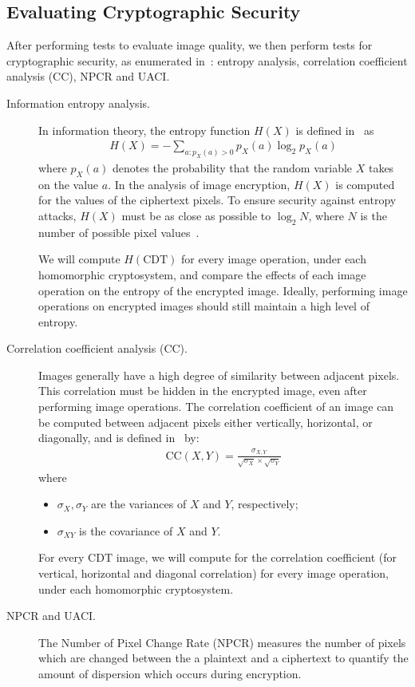 \subsection{Evaluating Cryptographic Security}
After performing tests to evaluate image quality, we then perform tests for cryptographic security, as enumerated in~\cite{ahmed_benchmark_2016}: entropy analysis, correlation coefficient analysis (CC), NPCR and UACI.
\begin{description}
	\item [Information entropy analysis.] In information theory, the entropy function $H(X)$ is defined in~\cite{bauer_information_2005} as
	\begin{align}
		H(X) = - \sum_{a:p_X(a)>0}{p_X(a)\log_2{p_X(a)}}
	\end{align}
	where $p_X(a)$ denotes the probability that the random variable $X$ takes on the value $a$.
	In the analysis of image encryption, $H(X)$ is computed for the values of the ciphertext pixels. To ensure security against entropy attacks, $H(X)$ must be as close as possible to $\log_2{N}$, where $N$ is the number of possible pixel values~\cite{ahmed_benchmark_2016}.

    We will compute $H(\mathrm{CDT})$ for every image operation, under each homomorphic cryptosystem, and compare the effects of each image operation on the entropy of the encrypted image. Ideally, performing image operations on encrypted images should still maintain a high level of entropy.
	\item [Correlation coefficient analysis (CC).]
		Images generally have a high degree of similarity between adjacent pixels. This correlation must be hidden in the encrypted image, even after performing image operations.
		The correlation coefficient of an image can be computed between adjacent pixels either vertically, horizontal, or diagonally, and is defined in~\cite{ahmed_benchmark_2016} by:
		\begin{align}
            \mathrm{CC}(X,Y) = \frac{\sigma_{X,Y}}{\sqrt{\sigma_X}\times\sqrt{\sigma_Y}}
		\end{align}
		where
		\begin{itemize}
			\item $\sigma_X, \sigma_Y$ are the variances of $X$ and $Y$, respectively;
			\item $\sigma_{XY}$ is the covariance of $X$ and $Y$.
		\end{itemize}

        For every $\mathrm{CDT}$ image, we will compute for the correlation coefficient (for vertical, horizontal and diagonal correlation) for every image operation, under each homomorphic cryptosystem.
	\item [NPCR and UACI.]
		The Number of Pixel Change Rate (NPCR) measures the number of pixels which are changed between the a plaintext and a ciphertext to quantify the amount of dispersion which occurs during encryption.


\end{description}
